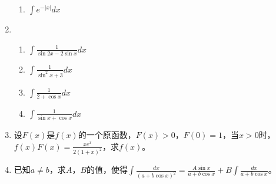 \begin{enumerate}[{例}1.]
\begin{enumerate}[(1)]
                \item $\int e^{-\left|x\right|}dx$
            \end{enumerate}
    \item   \begin{enumerate}[(1)]
                \item $\int \frac{1}{\sin 2x - 2 \sin x}dx$
                \item $\int \frac{1}{\sin^2 x+3}dx$
                \item $\int \frac{1}{2+\cos x}dx$
                \item $\int \frac{1}{\sin x+\cos x}dx$
            \end{enumerate}
    \item 设$F(x)$是$f(x)$的一个原函数，$F(x)>0$，$F(0)=1$，当$x>0$时，$f(x)F(x)=\frac{xe^x}{2(1+x)^2}$，求$f(x)$。
    \item 已知$a\neq b$，求$A$，$B$的值，使得$\int \frac{dx}{(a+b\cos x)^2}=\frac{A\sin x}{a+b\cos x}+B\int \frac{dx}{a + b\cos x}$。
\end{enumerate}
